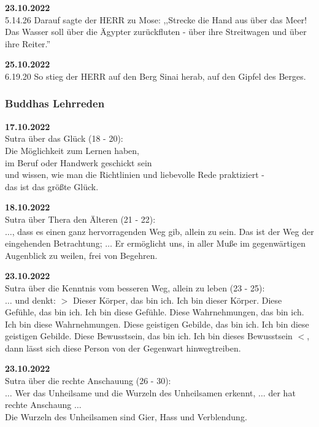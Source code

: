 \documentclass[10pt,a4paper]{article}
\begin{document}
\vskip 4pt
{\bf 23.10.2022} \\
5.14.26 Darauf sagte der HERR zu Mose: ,,Strecke die Hand aus über das Meer! Das
Wasser soll über die Ägypter zurückfluten - über ihre Streitwagen und über ihre
Reiter.''

\vskip 4pt
{\bf 25.10.2022} \\
6.19.20 So stieg der HERR auf den Berg Sinai herab, auf den Gipfel des Berges.


\subsubsection{Buddhas Lehrreden}

{\bf 17.10.2022} \\
Sutra über das Glück (18 - 20): \\
Die Möglichkeit zum Lernen haben, \\
im Beruf oder Handwerk geschickt sein \\
und wissen, wie man die Richtlinien und liebevolle Rede praktiziert - \\
das ist das größte Glück.

\vskip 4pt
{\bf 18.10.2022} \\
Sutra über Thera den Älteren (21 - 22): \\
$\ldots$, dass es einen ganz hervorragenden Weg gib, allein zu sein. Das ist der
Weg der eingehenden Betrachtung; $\ldots$ Er ermöglicht uns, in aller Muße im
gegenwärtigen Augenblick zu weilen, frei von Begehren.

\vskip 4pt
{\bf 23.10.2022} \\
Sutra über die Kenntnis vom besseren Weg, allein zu leben (23 - 25): \\
$\ldots$ und denkt: $>$ Dieser Körper, das bin ich. Ich bin dieser Körper. Diese
Gefühle, das bin ich. Ich bin diese Gefühle. Diese Wahrnehmungen, das bin ich.
Ich bin diese Wahrnehmungen. Diese geistigen Gebilde, das bin ich. Ich bin diese
geistigen Gebilde. Diese Bewusstsein, das bin ich. Ich bin dieses
Bewusstsein $<$, dann lässt sich diese Person von der Gegenwart hinwegtreiben.

\vskip 4pt
{\bf 23.10.2022} \\
Sutra über die rechte Anschauung (26 - 30): \\
$\ldots$ Wer das Unheilsame und die Wurzeln des Unheilsamen erkennt, $\ldots$
der hat rechte Anschaung $\ldots$ \\
Die Wurzeln des Unheilsamen sind Gier, Hass und Verblendung.
\end{document}
